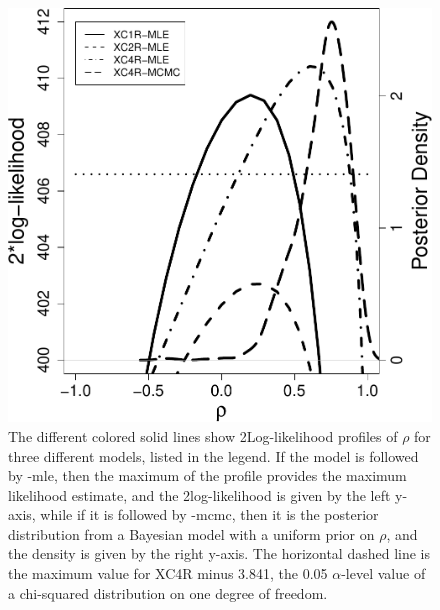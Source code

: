 \documentclass[11pt, titlepage]{article}\usepackage[]{graphicx}\usepackage[]{color}
\begin{document}
\begin{figure}[H]
  \begin{center}
  \includegraphics[width=\linewidth]{figure/Fig-rhoProfile-crop.pdf}
  \end{center}
  \caption{The different colored solid lines show 2Log-likelihood profiles of $\rho$ for three different models, listed in the legend.  If the model is followed by -mle, then the maximum of the profile provides the maximum likelihood estimate, and the 2log-likelihood is given by the left y-axis, while if it is followed by -mcmc, then it is the posterior distribution from a Bayesian model with a uniform prior on $\rho$, and the density is given by the right y-axis.  The horizontal dashed line is the maximum value for XC4R minus 3.841, the 0.05 $\alpha$-level value of a chi-squared distribution on one degree of freedom. \label{Fig-rhoProfile}}     
\end{figure}

\end{document}
